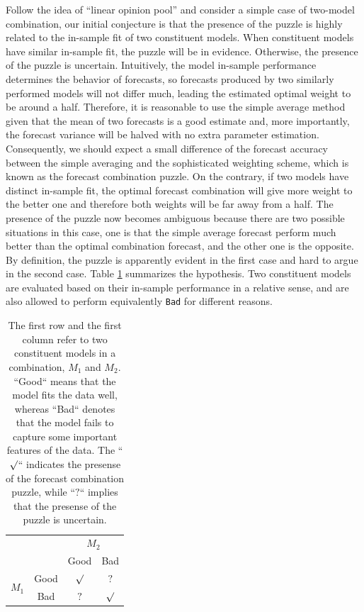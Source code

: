 \documentclass{monashthesis}
\begin{document}
Follow the idea of ``linear opinion pool'' \autocite{HM07,GA11} and consider a simple case of two-model combination, our initial conjecture is that the presence of the puzzle is highly related to the in-sample fit of two constituent models. When constituent models have similar in-sample fit, the puzzle will be in evidence. Otherwise, the presence of the puzzle is uncertain. Intuitively, the model in-sample performance determines the behavior of forecasts, so forecasts produced by two similarly performed models will not differ much, leading the estimated optimal weight to be around a half. Therefore, it is reasonable to use the simple average method given that the mean of two forecasts is a good estimate and, more importantly, the forecast variance will be halved with no extra parameter estimation. Consequently, we should expect a small difference of the forecast accuracy between the simple averaging and the sophisticated weighting scheme, which is known as the forecast combination puzzle. On the contrary, if two models have distinct in-sample fit, the optimal forecast combination will give more weight to the better one and therefore both weights will be far away from a half. The presence of the puzzle now becomes ambiguous because there are two possible situations in this case, one is that the simple average forecast perform much better than the optimal combination forecast, and the other one is the opposite. By definition, the puzzle is apparently evident in the first case and hard to argue in the second case. Table \ref{tab:1} summarizes the hypothesis. Two constituent models are evaluated based on their in-sample performance in a relative sense, and are also allowed to perform equivalently \texttt{Bad} for different reasons.

\begin{table}[ht]
\centering
\begin{tabular}{cccc}
                       &      & \multicolumn{2}{c}{$M_2$} \\
                       &      & Good       & Bad       \\
\multirow{2}{*}{$M_1$} & Good & $\surd$    & $?$ \\
                       & Bad  & $?$        & $\surd$
\end{tabular}
\caption{The first row and the first column refer to two constituent models in a combination, $M_1$ and $M_2$. ``Good`` means that the model fits the data well, whereas ``Bad`` denotes that the model fails to capture some important features of the data. The ``$\surd$`` indicates the presense of the forecast combination puzzle, while ``$?$`` implies that the presense of the puzzle is uncertain.}
\label{tab:1}
\end{table}
\end{document}
